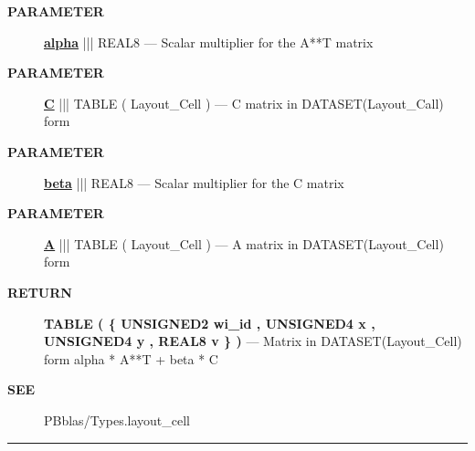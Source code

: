 \par
\begin{description}
\item [\colorbox{tagtype}{\color{white} \textbf{\textsf{PARAMETER}}}] \textbf{\underline{alpha}} ||| REAL8 --- Scalar multiplier for the A**T matrix
\item [\colorbox{tagtype}{\color{white} \textbf{\textsf{PARAMETER}}}] \textbf{\underline{C}} ||| TABLE ( Layout\_Cell ) --- C matrix in DATASET(Layout\_Call) form
\item [\colorbox{tagtype}{\color{white} \textbf{\textsf{PARAMETER}}}] \textbf{\underline{beta}} ||| REAL8 --- Scalar multiplier for the C matrix
\item [\colorbox{tagtype}{\color{white} \textbf{\textsf{PARAMETER}}}] \textbf{\underline{A}} ||| TABLE ( Layout\_Cell ) --- A matrix in DATASET(Layout\_Cell) form
\end{description}







\par
\begin{description}
\item [\colorbox{tagtype}{\color{white} \textbf{\textsf{RETURN}}}] \textbf{TABLE ( \{ UNSIGNED2 wi\_id , UNSIGNED4 x , UNSIGNED4 y , REAL8 v \} )} --- Matrix in DATASET(Layout\_Cell) form alpha * A**T + beta * C
\end{description}







\par
\begin{description}
\item [\colorbox{tagtype}{\color{white} \textbf{\textsf{SEE}}}] PBblas/Types.layout\_cell
\end{description}



\rule{\linewidth}{0.5pt}
